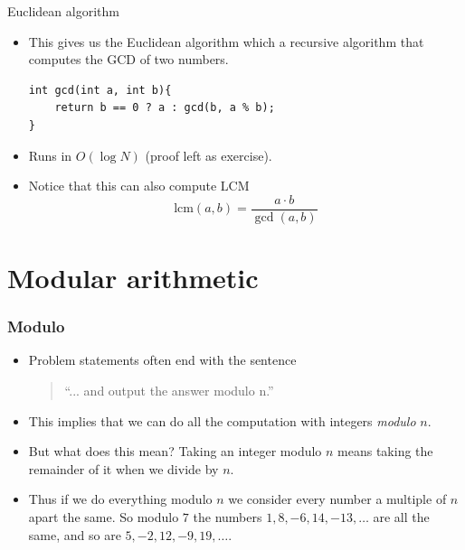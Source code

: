 \documentclass{beamer}
\begin{document}
\begin{frame}{Euclidean algorithm}
  \vspace{20pt}
  \begin{itemize}
    \item This gives us the Euclidean algorithm which a recursive algorithm that computes the GCD of two numbers.
      \begin{verbatim}
int gcd(int a, int b){
    return b == 0 ? a : gcd(b, a % b);
}
    \end{verbatim}
    \item Runs in $O(\log N)$ (proof left as exercise).
    \item Notice that this can also compute LCM
      \[
        \text{lcm}(a, b) = \frac{a\cdot b}{\gcd(a,b)}
      \]
  \end{itemize}
\end{frame}

\section*{Modular arithmetic}

\begin{frame}
  \frametitle{Modulo}
  \vspace{30pt}
  \begin{itemize}
    \item Problem statements often end with the sentence \\
      \vspace{10pt}
      \begin{quote}
``... and output the answer modulo n.''
      \end{quote}
      \vspace{10pt}
    \item This implies that we can do all the computation with integers \emph{modulo }$n$.
    \item But what does this mean? Taking an integer modulo $n$ means taking the remainder of it when we divide by $n$.
    \item Thus if we do everything modulo $n$ we consider every number a multiple of $n$ apart the same. So modulo $7$ the numbers $1, 8, -6, 14, -13, \dots$ are all the same, and so are $5, -2, 12, -9, 19, \dots$.
  \end{itemize}
\end{frame}
\end{document}
